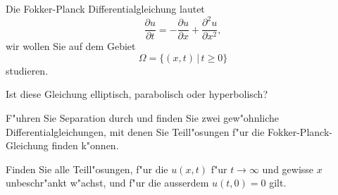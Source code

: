 Die Fokker-Planck Differentialgleichung lautet
\[
\frac{\partial u}{\partial t}
=
-\frac{\partial u}{\partial x}+\frac{\partial^2u}{\partial x^2},
\]
wir wollen Sie auf dem Gebiet
\[
\Omega=\{(x,t)\,|\,  t \ge 0\}
\]
studieren.
\begin{teilaufgaben}
\item Ist diese Gleichung elliptisch, parabolisch oder hyperbolisch?
\item F"uhren Sie Separation durch und finden Sie zwei gew"ohnliche
Differentialgleichungen, mit denen Sie Teill"osungen f"ur
die Fokker-Planck-Gleichung finden k"onnen.
\item Finden Sie alle Teill"osungen, f"ur die $u(x,t)$ f"ur $t\to\infty$
und gewisse $x$ unbeschr"ankt w"achst, und f"ur die ausserdem $u(t,0)=0$ gilt.
\end{teilaufgaben}

